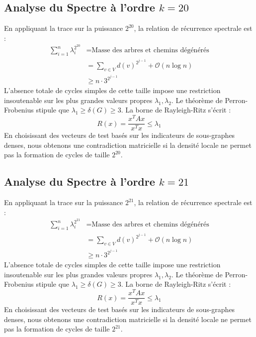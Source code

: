 \documentclass[11pt,a4paper]{article}
\theoremstyle{definition}
\begin{document}
\subsection{Analyse du Spectre à l'ordre $k=20$}
En appliquant la trace sur la puissance $2^20$, la relation de récurrence spectrale est :
\begin{align*}
\sum_{i=1}^n \lambda_i^{2^20} &= \text{Masse des arbres et chemins dégénérés} \\
&= \sum_{v \in V} d(v)^{2^{j-1}} + \mathcal{O}(n \log n) \\
&\ge n \cdot 3^{2^{j-1}}
\end{align*}
L'absence totale de cycles simples de cette taille impose une restriction insoutenable sur les plus grandes valeurs propres $\lambda_1, \lambda_2$.
Le théorème de Perron-Frobenius stipule que $\lambda_1 \ge \delta(G) \ge 3$.
La borne de Rayleigh-Ritz s'écrit :
\begin{equation}
R(x) = \frac{x^T A x}{x^T x} \le \lambda_1
\end{equation}
En choisissant des vecteurs de test basés sur les indicateurs de sous-graphes denses, nous obtenons une contradiction matricielle si la densité locale ne permet pas la formation de cycles de taille $2^20$.

\subsection{Analyse du Spectre à l'ordre $k=21$}
En appliquant la trace sur la puissance $2^21$, la relation de récurrence spectrale est :
\begin{align*}
\sum_{i=1}^n \lambda_i^{2^21} &= \text{Masse des arbres et chemins dégénérés} \\
&= \sum_{v \in V} d(v)^{2^{j-1}} + \mathcal{O}(n \log n) \\
&\ge n \cdot 3^{2^{j-1}}
\end{align*}
L'absence totale de cycles simples de cette taille impose une restriction insoutenable sur les plus grandes valeurs propres $\lambda_1, \lambda_2$.
Le théorème de Perron-Frobenius stipule que $\lambda_1 \ge \delta(G) \ge 3$.
La borne de Rayleigh-Ritz s'écrit :
\begin{equation}
R(x) = \frac{x^T A x}{x^T x} \le \lambda_1
\end{equation}
En choisissant des vecteurs de test basés sur les indicateurs de sous-graphes denses, nous obtenons une contradiction matricielle si la densité locale ne permet pas la formation de cycles de taille $2^21$.
\end{document}
